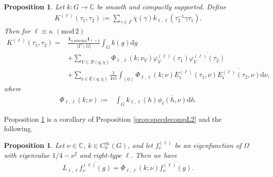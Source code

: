 \documentclass[12pt]{amsart}
\newtheorem{proposition}[theorem]{Proposition}
\theoremstyle{definition}
\theoremstyle{remark}
\numberwithin{equation}{section}
\newcommand{\C}{{\mathbb C}}
\newcommand{\1}{{\mathbf 1}}
\renewcommand{\d}{\mathrm d}
\renewcommand{\pmod}[1]{\,\,(\mathrm{mod}\,{#1})}
\begin{document}
\begin{proposition} \label{prop:spectralexpofkernel}
    Let $k:G \to \C$ be smooth and compactly supported. Define
    \begin{align*}
        K^{(\ell)}(\tau_1,\tau_2) := \sum_{\gamma \in \Gamma} \overline{\chi}(\gamma)k_{\ell,\ell}(\tau_2^{-1} \gamma \tau_1).
    \end{align*}
   Then for $\ell \equiv \kappa \pmod{2}$
    \begin{align*}
        K^{(\ell)}(\tau_1,\tau_2) = & \frac{\mathbf{1}_{\chi \,\mathrm{principal}} \mathbf{1}_{\ell=0}}{|\Gamma \backslash G|} \int_G k(g) \d g  \\
      &+  \sum_{V\in \mathcal{B}(q,\chi)}
        \Phi_{\ell,\ell}(k;\nu_V) \varphi_V^{(\ell)}(\tau_1) \overline{\varphi_V^{(\ell)}(\tau_2)} \\
&+\sum_{\mathfrak{c}\in \mathfrak{C}(q,\chi)} \frac{1}{4 \pi i}  \int_{(0)}  \Phi_{\ell,\ell}(k;\nu)E^{(\ell)}_{\mathfrak{c}}(\tau_1,\nu) \overline{E^{(\ell)}_{\mathfrak{c}}(\tau_2,\nu)} \d \nu,
    \end{align*}
    where 
    \begin{align} \label{eq:hfromkdefinition}
\Phi_{\ell,\ell}(k;\nu) :=& \int_G  k_{\ell,\ell}(h) \overline{\phi_{\ell}(h,\nu)} \d h .
    \end{align}
\end{proposition}

Proposition \ref{prop:spectralexpofkernel} is a corollary of Proposition \ref{prop:specdecompL2} and the following.
\begin{proposition} \label{prop:integraloperator}
Let $\nu \in \C$, $k \in C_0^\infty(G)$, and let $f_\nu^{(\ell)}$ be an eigenfunction of $\Omega$ with eigenvalue $1/4-\nu^2$ and right-type $\ell$. Then we have 
\begin{align*}
    L_{\ell,\ell} \overline{f_\nu^{(\ell)} (g) }=  \Phi_{\ell,\ell}(k;\nu) \overline{ f_\nu^{(\ell)}(g)}.
\end{align*}
\end{proposition}
\end{document}
